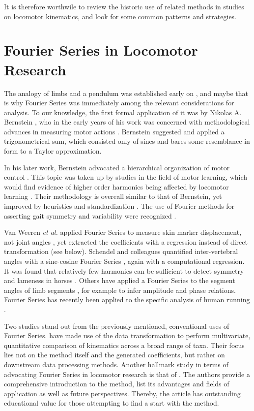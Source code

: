 It is therefore worthwile to review the historic use of related methods in studies on locomotor kinematics, and look for some common patterns and strategies.

\FloatBarrier\clearpage
\section{Fourier Series in Locomotor Research}
\label{history}
The analogy of limbs and a pendulum was established early on \citep{Weber1836,Braune1895}, and maybe that is why Fourier Series was immediately among the relevant considerations for analysis.
To our knowledge, the first formal application of it was by Nikolas A. Bernstein \citep{Bernstein1927a,Bernstein1935}, who in the early years of his work was concerned with methodological advances in measuring motor actions \citep{Bongaardt2000}.
Bernstein suggested and applied a trigonometrical sum, which consisted only of sines and bares some resemblance in form to a Taylor approximation.

In his later work, Bernstein advocated a hierarchical organization of motor control \citep[\textit{cf.}][]{Bongaardt2000}.
This topic was taken up by studies in the field of motor learning, which would find evidence of higher order harmonics being affected by locomotor learning \citep{Gallistel1982,Marteniuk1983}.
Their methodology is overeall similar to that of Bernstein, yet improved by heuristics and standardization \citep{Jackson1979,Porges1980}.
The use of Fourier methods for asserting gait symmetry and variability were recognized \citep{Soudan1982}.


Van Weeren \emph{et al.} applied Fourier Series to measure skin marker displacement, not joint angles \citep{vanWeeren1992}, yet extracted the coefficients with a regression instead of direct transformation (see below).
Schendel and colleagues quantified inter-vertebral angles with a sine-cosine Fourier Series \citep{Schendel1995}, again with a computational regression.
It was found that relatively few harmonics can be sufficient to detect symmetry and lameness in horses \citep{Audigie1999,Peham1996}.
Others have applied a Fourier Series to the segment angles of limb segments \citep{Grasso2000}, for example to infer amplitude and phase relations.
Fourier Series has recently been applied to the specific analysis of human running \citep{Skejo2021}.


Two studies stand out from the previously mentioned, conventional uses of Fourier Series.
\citet{Pike2002} have made use of the data transformation to perform multivariate, quantitative comparison of kinematics across a broad range of taxa.
Their focus lies not on the method itself and the generated coefficients, but rather on downstream data processing methods.
Another hallmark study in terms of advocating Fourier Series in locomotor research is that of \citet{Webb2007}.
The authors provide a comprehensive introduction to the method, list its advantages and fields of application as well as future perspectives.
Thereby, the article has outstanding educational value for those attempting to find a start with the method.


